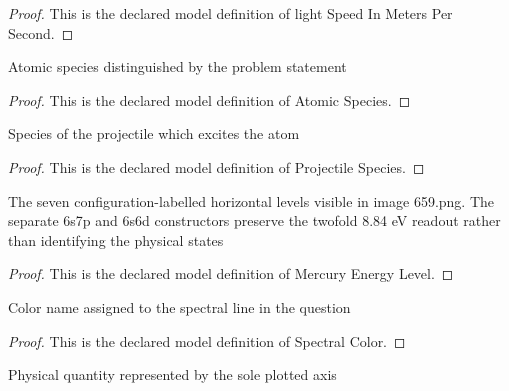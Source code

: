 \begin{proof}
  This is the declared model definition of light Speed In Meters Per Second.
\end{proof}
\begin{definition}
  \label{def:physics:phyx-mini-0659:phyxminiproblems-problemphyxmini0659-atomicspecies}
  Atomic species distinguished by the problem statement
\end{definition}
\begin{proof}
  This is the declared model definition of Atomic Species.
\end{proof}
\begin{definition}
  \label{def:physics:phyx-mini-0659:phyxminiproblems-problemphyxmini0659-projectilespecies}
  Species of the projectile which excites the atom
\end{definition}
\begin{proof}
  This is the declared model definition of Projectile Species.
\end{proof}
\begin{definition}
  \label{def:physics:phyx-mini-0659:phyxminiproblems-problemphyxmini0659-mercuryenergylevel}
  The seven configuration-labelled horizontal levels visible in image 659.png. The separate 6s7p and 6s6d constructors preserve the twofold 8.84 eV readout rather than identifying the physical states
\end{definition}
\begin{proof}
  This is the declared model definition of Mercury Energy Level.
\end{proof}
\begin{definition}
  \label{def:physics:phyx-mini-0659:phyxminiproblems-problemphyxmini0659-spectralcolor}
  Color name assigned to the spectral line in the question
\end{definition}
\begin{proof}
  This is the declared model definition of Spectral Color.
\end{proof}
\begin{definition}
  \label{def:physics:phyx-mini-0659:phyxminiproblems-problemphyxmini0659-figureaxisquantity}
  Physical quantity represented by the sole plotted axis
\end{definition}
